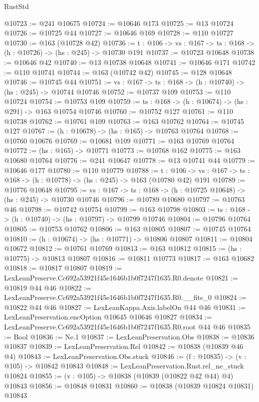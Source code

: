\begin{lexlean}{RustStd}
\begin{coremodule}
@10723 := @241 @10675
@10724 := @10646 @173
@10725 := @13 @10724
@10726 := @10725 @44
@10727 := @10646 @169
@10728 := @110 @10727
@10730 := @163 (@10728 @42)
@10736 := {t : @106} -> {vs : @167} -> {ts : @168} -> (h : @10726) -> (hs : @245) -> @10730 @191
@10737 := @10723 @10648
@10738 := @10646 @42
@10740 := @13 @10738 @10648
@10741 := @10646 @171
@10742 := @110 @10741
@10744 := @163 (@10742 @42)
@10745 := @128 @10648
@10746 := @10745 @44
@10751 := {vs : @167} -> {ts : @168} -> (h : @10740) -> (hs : @245) -> @10744 @10746
@10752 := @10737 @109
@10753 := @110 @10724
@10754 := @10753 @109
@10759 := {ts : @168} -> (h : @10674) -> (hs : @291) -> @163 @10754 @10746
@10760 := @10752 @127
@10761 := @110 @10738
@10762 := @10761 @109
@10763 := @163 @10762
@10764 := @10745 @127
@10767 := (h : @10678) -> (hs : @165) -> @10763 @10764
@10768 := @10760 @10676
@10769 := @10681 @109
@10771 := @163 @10769 @10764
@10772 := (hs : @165) -> @10771
@10773 := @10768 @162
@10775 := @163 @10680 @10764
@10776 := @241 @10647
@10778 := @13 @10741 @44
@10779 := @10646 @177
@10780 := @110 @10779
@10788 := {t : @106} ->
  {vs : @167} -> {ts : @168} -> (h : @10778) -> (hs : @245) -> @163 (@10780 @42) @191
@10789 := @10776 @10648
@10795 := {vs : @167} -> {ts : @168} -> (h : @10725 @10648) -> (hs : @245) -> @10730 @10746
@10796 := @10789 @10680
@10797 := @10763 @46
@10798 := @10742 @10754
@10799 := @163 @10798
@10803 := {ts : @168} -> (h : @10740) -> (hs : @10797) -> @10799 @10746
@10804 := @10796 @10764
@10805 := @10753 @10762
@10806 := @163 @10805
@10807 := @10745 @10764
@10810 := (h : @10674) -> (hs : @10771) -> @10806 @10807
@10811 := @10804 @10672
@10812 := @10761 @10769
@10813 := @163 @10812
@10815 := (hs : @10775) -> @10813 @10807
@10816 := @10811 @10773
@10817 := @163 @10682
@10818 := @10817 @10807
@10819 := LexLeanPreserve.Cc692a53921f45e1646b1b0f7247f1635.R0.denote
@10821 := @10819 @44 @46
@10822 := LexLeanPreserve.Cc692a53921f45e1646b1b0f7247f1635.R0.__fits_0
@10824 := @10822 @44 @46
@10827 := LexLeanKappa.Axis.labelOn @44 @46
@10831 := LexLeanPreservation.encOption @10645 @10646 @10827
@10834 := LexLeanPreserve.Cc692a53921f45e1646b1b0f7247f1635.R0.root @44 @46
@10835 := Bool
@10836 := Ne.{1}
@10837 := LexLeanPreservation.Obs
@10838 := @10836 @10837
@10839 := LexLeanPreservation.Rel
@10842 := @10838 (@10839 @46 @4)
@10843 := LexLeanPreservation.Obs.stuck
@10846 := (f : @10835) -> (v : @105) -> @10842 @10843
@10848 := LexLeanPreservation.Rust.rel_ne_stuck @10824
@10855 := (v : @105) -> @10838 (@10839 (@10822 @42 @44) @4) @10843
@10856 := @10848 @10831
@10860 := @10838 (@10839 @10824 @10831) @10843

\end{coremodule}
\end{lexlean}
